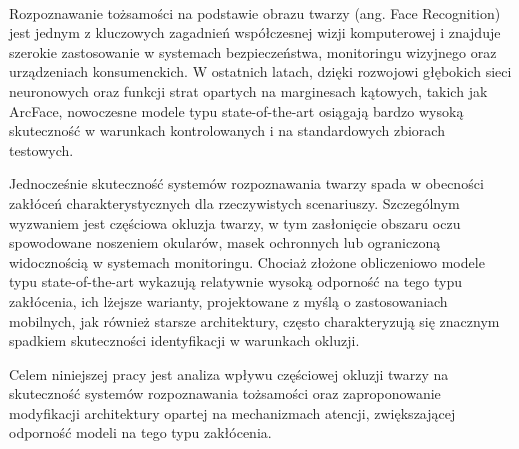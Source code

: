 \paragraph{}Rozpoznawanie tożsamości na podstawie obrazu twarzy (ang. Face Recognition) jest jednym z kluczowych zagadnień współczesnej wizji komputerowej i znajduje szerokie zastosowanie w systemach bezpieczeństwa, monitoringu wizyjnego oraz urządzeniach konsumenckich. W ostatnich latach, dzięki rozwojowi głębokich sieci neuronowych oraz funkcji strat opartych na marginesach kątowych, takich jak ArcFace, nowoczesne modele typu state-of-the-art osiągają bardzo wysoką skuteczność w warunkach kontrolowanych i na standardowych zbiorach testowych.

Jednocześnie skuteczność systemów rozpoznawania twarzy spada w obecności zakłóceń charakterystycznych dla rzeczywistych scenariuszy. Szczególnym wyzwaniem jest częściowa okluzja twarzy, w tym zasłonięcie obszaru oczu spowodowane noszeniem okularów, masek ochronnych lub ograniczoną widocznością w systemach monitoringu. Chociaż złożone obliczeniowo modele typu state-of-the-art wykazują relatywnie wysoką odporność na tego typu zakłócenia, ich lżejsze warianty, projektowane z myślą o zastosowaniach mobilnych, jak również starsze architektury, często charakteryzują się znacznym spadkiem skuteczności identyfikacji w warunkach okluzji.

Celem niniejszej pracy jest analiza wpływu częściowej okluzji twarzy na skuteczność
systemów rozpoznawania tożsamości oraz zaproponowanie modyfikacji architektury
opartej na mechanizmach atencji, zwiększającej odporność modeli na tego typu zakłócenia.